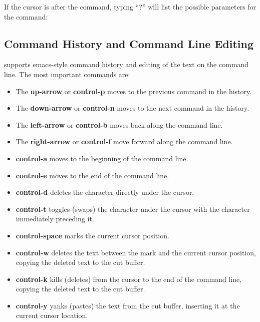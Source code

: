 \noindent
If the cursor is after the command, typing ``?'' will list the possible
parameters for the command:
\vspace{0.1in}

\noindent{}

\newpage
\subsection{Command History and Command Line Editing}

\xorpsh supports emacs-style command history and editing of the text
on the command line.  The most important commands are:
\begin{itemize}
\item The {\bf up-arrow} or {\bf control-p} moves to the previous
command in the history.
\item The {\bf down-arrow} or {\bf control-n} moves to the next
command in the history.
\item The {\bf left-arrow} or {\bf control-b} moves back along the
command line.
\item The {\bf right-arrow} or {\bf control-f} move forward along the
command line.
\item {\bf control-a} moves to the beginning of the command line.
\item {\bf control-e} moves to the end of the command line.
\item {\bf control-d} deletes the character directly under the cursor.
\item {\bf control-t} toggles (swaps) the character under the cursor with
the character immediately preceding it.
\item {\bf control-space} marks the current cursor position.
\item {\bf control-w} deletes the text between the mark and the current
cursor position, copying the deleted text to the cut buffer.
\item {\bf control-k} kills (deletes) from the cursor to the end of the
command line, copying the deleted text to the cut buffer.
\item {\bf control-y} yanks (pastes) the text from the cut buffer,
inserting it at the
current cursor location.
\end{itemize}

